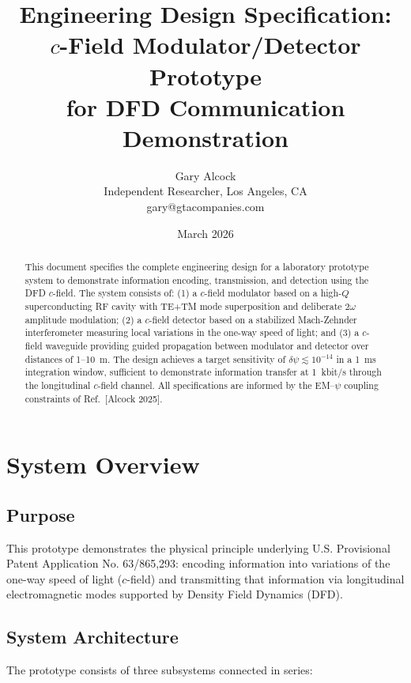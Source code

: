 \documentclass[11pt,letterpaper]{article}
\title{\Large\bfseries Engineering Design Specification:\\[6pt]
$c$-Field Modulator/Detector Prototype\\[6pt]
for DFD Communication Demonstration}
\author{Gary Alcock\\
\small Independent Researcher, Los Angeles, CA\\
\small gary@gtacompanies.com}
\date{March 2026}
\newcommand{\psifield}{\psi}
\begin{document}
\maketitle

\begin{abstract}
This document specifies the complete engineering design for a
laboratory prototype system to demonstrate information encoding,
transmission, and detection using the DFD $c$-field. The system
consists of: (1) a $c$-field modulator based on a high-$Q$
superconducting RF cavity with TE+TM mode superposition and
deliberate $2\omega$ amplitude modulation; (2) a $c$-field detector
based on a stabilized Mach-Zehnder interferometer measuring local
variations in the one-way speed of light; and (3) a $c$-field
waveguide providing guided propagation between modulator and
detector over distances of 1--10~m. The design achieves a target
sensitivity of $\delta\psifield \lesssim 10^{-14}$ in a 1~ms
integration window, sufficient to demonstrate information transfer
at 1~kbit/s through the longitudinal $c$-field channel. All
specifications are informed by the EM--$\psifield$ coupling
constraints of Ref.~[Alcock 2025].
\end{abstract}

\tableofcontents
\newpage

\section{System Overview}
\label{sec:overview}

\subsection{Purpose}

This prototype demonstrates the physical principle underlying
U.S. Provisional Patent Application No. 63/865,293: encoding
information into variations of the one-way speed of light
($c$-field) and transmitting that information via longitudinal
electromagnetic modes supported by Density Field Dynamics (DFD).

\subsection{System Architecture}

The prototype consists of three subsystems connected in series:
\end{document}
